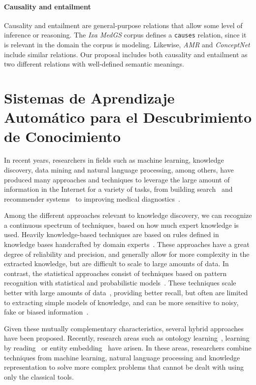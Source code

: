   \paragraph{Causality and entailment}
  Causality and entailment are general-purpose relations that allow some level of inference or reasoning. The \textit{Ixa MedGS} corpus defines a \texttt{causes} relation, since it is relevant in the domain the corpus is modeling. Likewise, \textit{AMR} and \textit{ConceptNet} include similar relations. Our proposal includes both causality and entailment as two different relations with well-defined semantic meanings.

  \section{Sistemas de Aprendizaje Automático para el Descubrimiento de Conocimiento}

  In recent years, researchers in fields such as machine learning, knowledge discovery, data mining and
natural language processing, among others, have produced many approaches and techniques to
leverage the large amount of information in the Internet for a variety of tasks, from
building search~\cite{google} and recommender systems~\cite{youtube}
to improving medical diagnostics~\cite{watson}.

Among the different approaches relevant to knowledge discovery, we can recognize a
continuous spectrum of techniques, based on how much expert knowledge is used.
Heavily knowledge-based techniques are based
on rules defined in knowledge bases handcrafted by domain experts~\cite{chandrasekaran1986generic}.
These approaches have a great degree
of reliability and precision, and generally allow for more complexity in the extracted knowledge,
but are difficult to scale to large amounts of data.
In contrast, the statistical approaches consist of techniques based on pattern recognition with statistical
and probabilistic models~\cite{kevin2012machine}. These techniques scale better with large amounts of data~\cite{le2013building},
providing better recall, but often are limited to extracting simple models of knowledge,
and can be more sensitive to noisy, fake or biased information~\cite{bolukbasi2016man}.

Given these mutually complementary characteristics, several hybrid approaches have been proposed.
Recently, research areas such as ontology learning~\cite{cimiano2009ontology},
learning by reading~\cite{barker2007learning} or entity embedding~\cite{hu2015entity} have arisen.
In these areas, researchers combine techniques from machine learning, natural language
processing and knowledge representation to solve more complex problems that cannot
be dealt with using only the classical tools.

